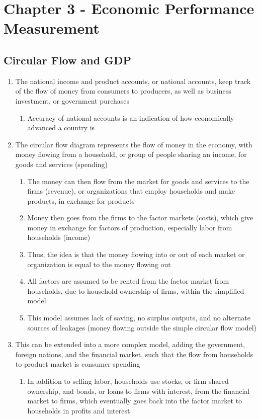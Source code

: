 \documentclass[11 pt, twoside]{article}
\begin{document}
\section{Chapter 3 - Economic Performance Measurement}
\subsection{Circular Flow and GDP}
\begin{enumerate}
\item The national income and product accounts, or national accounts, keep track of the flow of money from consumers to producers, as well as business investment, or government purchases
\begin{enumerate}
\item Accuracy of national accounts is an indication of how economically advanced a country is
\end{enumerate}
\item The circular flow diagram represents the flow of money in the economy, with money flowing from a household, or group of people sharing an income, for goods and services (spending)
\begin{enumerate}
\item The money can then flow from the market for goods and services to the firms (revenue), or organizations that employ households and make products, in exchange for products
\item Money then goes from the firms to the factor markets (costs), which give money in exchange for factors of production, especially labor from households (income)
\item Thus, the idea is that the money flowing into or out of each market or organization is equal to the money flowing out
\item All factors are assumed to be rented from the factor market from households, due to household ownership of firms, within the simplified model
\item This model assumes lack of saving, no surplus outputs, and no alternate sources of leakages (money flowing outside the simple circular flow model)
\end{enumerate}
\item This can be extended into a more complex model, adding the government, foreign nations, and the financial market, such that the flow from households to product market is consumer spending
\begin{enumerate}
\item In addition to selling labor, households use stocks, or firm shared ownership, and bonds, or loans to firms with interest, from the financial market to firms, which eventually goes back into the factor market to households in profits and interest

\end{enumerate}
\end{enumerate}
\end{document}
